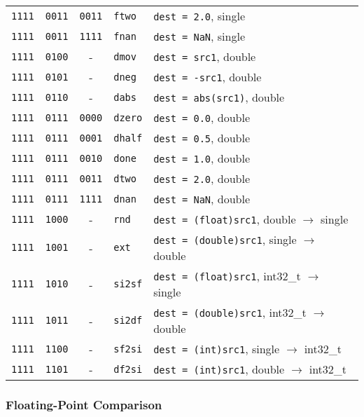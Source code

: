 \documentclass[10pt,DIV12]{scrartcl}
\begin{document}
\begin{tabular}{cccll}
\texttt{1111} & \texttt{0011} & \texttt{0011} & \texttt{ftwo} & \texttt{dest = 2.0}, single \\
\texttt{1111} & \texttt{0011} & \texttt{1111} & \texttt{fnan} & \texttt{dest = NaN}, single \\
\texttt{1111} & \texttt{0100} & - & \texttt{dmov} & \texttt{dest = src1}, double \\
\texttt{1111} & \texttt{0101} & - & \texttt{dneg} & \texttt{dest = -src1}, double \\
\texttt{1111} & \texttt{0110} & - & \texttt{dabs} & \texttt{dest = abs(src1)}, double \\
\texttt{1111} & \texttt{0111} & \texttt{0000} & \texttt{dzero} & \texttt{dest = 0.0}, double \\
\texttt{1111} & \texttt{0111} & \texttt{0001} & \texttt{dhalf} & \texttt{dest = 0.5}, double \\
\texttt{1111} & \texttt{0111} & \texttt{0010} & \texttt{done} & \texttt{dest = 1.0}, double \\
\texttt{1111} & \texttt{0111} & \texttt{0011} & \texttt{dtwo} & \texttt{dest = 2.0}, double \\
\texttt{1111} & \texttt{0111} & \texttt{1111} & \texttt{dnan} & \texttt{dest = NaN}, double \\
\texttt{1111} & \texttt{1000} & - & \texttt{rnd} & \texttt{dest = (float)src1}, double $\rightarrow$ single \\
\texttt{1111} & \texttt{1001} & - & \texttt{ext} & \texttt{dest = (double)src1}, single $\rightarrow$ double \\
\texttt{1111} & \texttt{1010} & - & \texttt{si2sf} & \texttt{dest = (float)src1}, int32\_t $\rightarrow$ single \\
\texttt{1111} & \texttt{1011} & - & \texttt{si2df} & \texttt{dest = (double)src1}, int32\_t $\rightarrow$ double \\
\texttt{1111} & \texttt{1100} & - & \texttt{sf2si} & \texttt{dest = (int)src1}, single $\rightarrow$ int32\_t \\
\texttt{1111} & \texttt{1101} & - & \texttt{df2si} & \texttt{dest = (int)src1}, double $\rightarrow$ int32\_t \\
\bottomrule
\end{tabular}

\subsubsection{Floating-Point Comparison}
\label{sec:fcmp}
\end{document}
